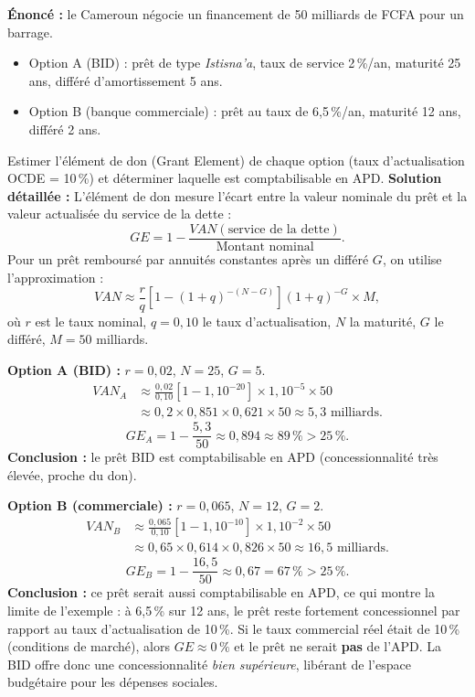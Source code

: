 \documentclass[11pt]{article}
\begin{document}
\begin{exoresolu}
\textbf{Énoncé :} le Cameroun négocie un financement de 50 milliards de FCFA pour un barrage.
\begin{itemize}
    \item Option A (BID) : prêt de type \emph{Istisna'a}, taux de service 2\,\%/an, maturité 25 ans, différé d'amortissement 5 ans.
    \item Option B (banque commerciale) : prêt au taux de 6,5\,\%/an, maturité 12 ans, différé 2 ans.
\end{itemize}
Estimer l'élément de don (Grant Element) de chaque option (taux d'actualisation OCDE = 10\,\%) et déterminer laquelle est comptabilisable en APD.
\tcblower
\textbf{Solution détaillée :}
L'élément de don mesure l'écart entre la valeur nominale du prêt et la valeur actualisée du service de la dette :
\[ GE = 1 - \frac{VAN(\text{service de la dette})}{\text{Montant nominal}}. \]
Pour un prêt remboursé par annuités constantes après un différé $G$, on utilise l'approximation :
\[ VAN \approx \frac{r}{q}\left[1-(1+q)^{-(N-G)}\right](1+q)^{-G}\times M, \]
où $r$ est le taux nominal, $q=0{,}10$ le taux d'actualisation, $N$ la maturité, $G$ le différé, $M=50$ milliards.

\textbf{Option A (BID) :} $r=0{,}02$, $N=25$, $G=5$.
\begin{align*}
VAN_A &\approx \frac{0{,}02}{0{,}10}\left[1-1{,}10^{-20}\right]\times 1{,}10^{-5}\times 50 \\
&\approx 0{,}2 \times 0{,}851 \times 0{,}621 \times 50 \approx 5{,}3 \text{ milliards.}
\end{align*}
\[ GE_A = 1-\frac{5{,}3}{50} \approx 0{,}894 \approx 89\,\% > 25\,\%. \]
\textbf{Conclusion :} le prêt BID est comptabilisable en APD (concessionnalité très élevée, proche du don).

\textbf{Option B (commerciale) :} $r=0{,}065$, $N=12$, $G=2$.
\begin{align*}
VAN_B &\approx \frac{0{,}065}{0{,}10}\left[1-1{,}10^{-10}\right]\times 1{,}10^{-2}\times 50 \\
&\approx 0{,}65 \times 0{,}614 \times 0{,}826 \times 50 \approx 16{,}5 \text{ milliards.}
\end{align*}
\[ GE_B = 1-\frac{16{,}5}{50} \approx 0{,}67 = 67\,\% > 25\,\%. \]
\textbf{Conclusion :} ce prêt serait aussi comptabilisable en APD, ce qui montre la limite de l'exemple : à 6,5\,\% sur 12 ans, le prêt reste fortement concessionnel par rapport au taux d'actualisation de 10\,\%. Si le taux commercial réel était de 10\,\% (conditions de marché), alors $GE \approx 0\,\%$ et le prêt ne serait \textbf{pas} de l'APD. La BID offre donc une concessionnalité \emph{bien supérieure}, libérant de l'espace budgétaire pour les dépenses sociales.
\end{exoresolu}
\end{document}
